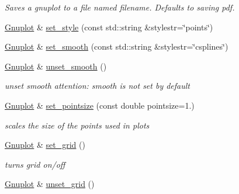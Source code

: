 \begin{DoxyCompactItemize}
\begin{DoxyCompactList}\small\item\em Saves a gnuplot to a file named filename. Defaults to saving pdf. \end{DoxyCompactList}\item 
\hyperlink{class_gnuplot}{Gnuplot} \& \hyperlink{class_gnuplot_acfdcda292650775ebed4683e8e1515b5}{set\-\_\-style} (const std\-::string \&stylestr=\char`\"{}points\char`\"{})
\item 
\hyperlink{class_gnuplot}{Gnuplot} \& \hyperlink{class_gnuplot_aa18386919da2ec4c994f1f9c7195d384}{set\-\_\-smooth} (const std\-::string \&stylestr=\char`\"{}csplines\char`\"{})
\item 
\hyperlink{class_gnuplot}{Gnuplot} \& \hyperlink{class_gnuplot_ad9dfbccd66dece1dbe5803605c6ab08c}{unset\-\_\-smooth} ()
\begin{DoxyCompactList}\small\item\em unset smooth attention\-: smooth is not set by default \end{DoxyCompactList}\item 
\hypertarget{class_gnuplot_a95ec1636a871447dfe99463b769339c7}{\hyperlink{class_gnuplot}{Gnuplot} \& \hyperlink{class_gnuplot_a95ec1636a871447dfe99463b769339c7}{set\-\_\-pointsize} (const double pointsize=1.)}\label{class_gnuplot_a95ec1636a871447dfe99463b769339c7}

\begin{DoxyCompactList}\small\item\em scales the size of the points used in plots \end{DoxyCompactList}\item 
\hypertarget{class_gnuplot_a5416c8e81f1b9945b9631fa85a8d4f47}{\hyperlink{class_gnuplot}{Gnuplot} \& \hyperlink{class_gnuplot_a5416c8e81f1b9945b9631fa85a8d4f47}{set\-\_\-grid} ()}\label{class_gnuplot_a5416c8e81f1b9945b9631fa85a8d4f47}

\begin{DoxyCompactList}\small\item\em turns grid on/off \end{DoxyCompactList}\item 
\hypertarget{class_gnuplot_a53183e1487bc6977f0d46bf75d19b4d3}{\hyperlink{class_gnuplot}{Gnuplot} \& \hyperlink{class_gnuplot_a53183e1487bc6977f0d46bf75d19b4d3}{unset\-\_\-grid} ()}\label{class_gnuplot_a53183e1487bc6977f0d46bf75d19b4d3}


\end{DoxyCompactItemize}
